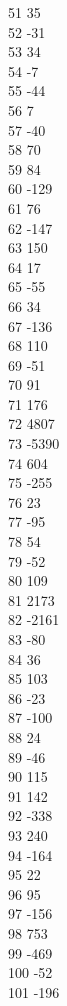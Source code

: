 { 51	35 \\
 52	-31 \\
 53	34 \\
 54	-7 \\
 55	-44 \\
 56	7 \\
 57	-40 \\
 58	70 \\
 59	84 \\
 60	-129 \\
 61	76 \\
 62	-147 \\
 63	150 \\
 64	17 \\
 65	-55 \\
 66	34 \\
 67	-136 \\
 68	110 \\
 69	-51 \\
 70	91 \\
 71	176 \\
 72	4807 \\
 73	-5390 \\
 74	604 \\
 75	-255 \\
 76	23 \\
 77	-95 \\
 78	54 \\
 79	-52 \\
 80	109 \\
 81	2173 \\
 82	-2161 \\
 83	-80 \\
 84	36 \\
 85	103 \\
 86	-23 \\
 87	-100 \\
 88	24 \\
 89	-46 \\
 90	115 \\
 91	142 \\
 92	-338 \\
 93	240 \\
 94	-164 \\
 95	22 \\
 96	95 \\
 97	-156 \\
 98	753 \\
 99	-469 \\
 100	-52 \\
 101	-196 \\
}
